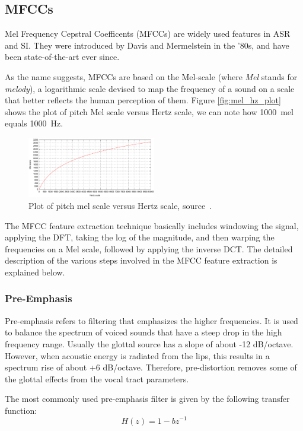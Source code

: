 \subsection{MFCCs}
Mel Frequency Cepstral Coefficents (MFCCs) are widely used features in ASR and SI. They were introduced by Davis and Mermelstein in the '80s, and have been state-of-the-art ever since.

As the name suggests, MFCCs are based on the Mel-scale (where \textit{Mel} stands for \textit{melody}), a logarithmic scale devised to map the frequency of a sound on a scale that better reflects the human perception of them. Figure \vref{fig:mel_hz_plot} shows the plot of pitch Mel scale versus Hertz scale, we can note how \SI{1000}{mel} equals \SI{1000}{Hz}.

\begin{figure}
	\includegraphics[width=0.5\textwidth]{images/mel_hz_plot}
	\caption{Plot of pitch mel scale versus Hertz scale, source~\cite{wiki:mel_scale}.}
	\label{fig:mel_hz_plot}
\end{figure}

The MFCC feature extraction technique basically includes windowing the signal, applying the DFT, taking the log of the magnitude, and then warping the frequencies on a Mel scale, followed by applying the inverse DCT. The detailed description of the various steps involved in the MFCC feature extraction is explained below.

\subsubsection{Pre-Emphasis}
Pre-emphasis refers to filtering that emphasizes the higher frequencies. It is used to balance the spectrum of voiced sounds that have a steep drop in the high frequency range. Usually the glottal source has a slope of about -12 dB/octave. However, when acoustic energy is radiated from the lips, this results in a spectrum rise of about +6 dB/octave. Therefore, pre-distortion removes some of the glottal effects from the vocal tract parameters.

The most commonly used pre-emphasis filter is given by the following transfer function:
$$
H(z)=1-b z^{-1}
$$

